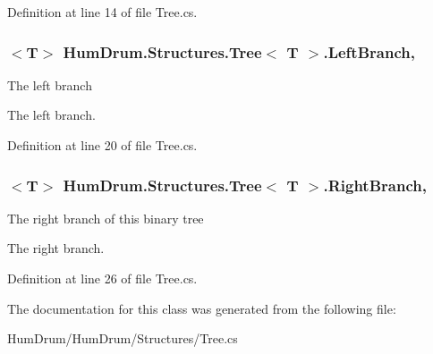 Definition at line 14 of file Tree.\+cs.

\hypertarget{classHumDrum_1_1Structures_1_1Tree_a713658d58f7222e2b3de4878f74abcf2}{}
\subsubsection[{Left\+Branch}]{$<$T$>$ {\bf Hum\+Drum.\+Structures.\+Tree}$<$ T $>$.Left\+Branch\hspace{0.3cm}{\ttfamily [get]}, {\ttfamily [set]}}\label{classHumDrum_1_1Structures_1_1Tree_a713658d58f7222e2b3de4878f74abcf2}


The left branch 

The left branch.

Definition at line 20 of file Tree.\+cs.

\hypertarget{classHumDrum_1_1Structures_1_1Tree_a2b0d1d71d45216c34d14479b04a6c7a8}{}
\subsubsection[{Right\+Branch}]{$<$T$>$ {\bf Hum\+Drum.\+Structures.\+Tree}$<$ T $>$.Right\+Branch\hspace{0.3cm}{\ttfamily [get]}, {\ttfamily [set]}}\label{classHumDrum_1_1Structures_1_1Tree_a2b0d1d71d45216c34d14479b04a6c7a8}


The right branch of this binary tree 

The right branch.

Definition at line 26 of file Tree.\+cs.



The documentation for this class was generated from the following file\+:\begin{DoxyCompactItemize}
\item 
Hum\+Drum/\+Hum\+Drum/\+Structures/Tree.\+cs\end{DoxyCompactItemize}
